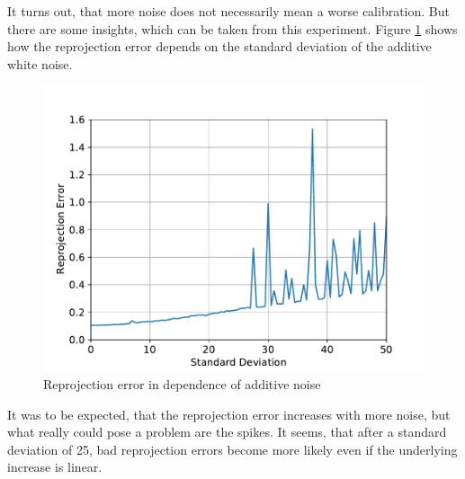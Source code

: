 It turns out, that more noise does not necessarily mean a worse calibration.
But there are some insights, which can be taken from this experiment.
Figure \ref{development:noise_rpe} shows how the reprojection error depends on the standard deviation of the additive white noise.
\begin{figure}
	\centering
	\includegraphics[width=0.9\linewidth]{3-development/calibration/images/noise_rpe.pdf}
	\caption{Reprojection error in dependence of additive noise\label{development:noise_rpe}}
\end{figure}
It was to be expected, that the reprojection error increases with more noise, but what really could pose a problem are the spikes.
It seems, that after a standard deviation of 25, bad reprojection errors become more likely even if the underlying increase is linear.

